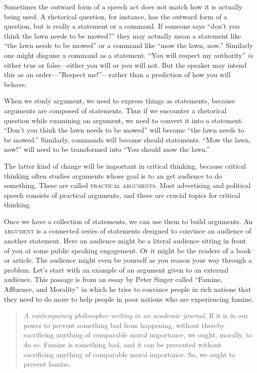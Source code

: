 Sometimes the outward form of a speech act does not match how it is actually being used. A rhetorical question, for instance, has the outward form of a question, but is really a statement or a command. If someone says ``don't you think the lawn needs to be mowed?'' they may actually mean a statement like ``the lawn needs to be mowed'' or a command like ``mow the lawn, now.'' Similarly one might disguise a command as a statement. ``You will respect my authority'' \emph{is} either true or false---either you will or you will not. But the speaker may intend this as an order---''Respect me!''---rather than a prediction of how you will behave.

When we study argument, we need to express things as statements, because arguments are composed of statements. Thus if we encounter a rhetorical question while examining an argument, we need to convert it into a statement. ``Don't you think the lawn needs to be mowed'' will become ``the lawn needs to be mowed.'' Similarly, commands will become should statements. ``Mow the lawn, now!'' will need to be transformed into ``You should mow the lawn.''

The latter kind of change will be important in critical thinking, because critical thinking often studies arguments whose goal is to an get audience to do something. These are called \textsc{\glspl{practical argument}}\label{def:practical_argument}. Most advertising and political speech consists of practical arguments, and these are crucial topics for critical thinking.

Once we have a collection of statements, we can use them to build arguments. An \textsc{\gls{argument}} \label{def:argument} is a connected series of statements designed to convince an audience of another statement. Here an audience might be a literal audience sitting in front of you at some public speaking engagement. Or it might be the readers of a book or article. The audience might even be yourself as you reason your way through a problem. Let's start with an example of an argument given to an external audience. This passage is from an essay by Peter Singer called ``Famine, Affluence, and Morality'' in which he tries to convince people in rich nations that they need to do more to help people in poor nations who are experiencing famine.

\begin{quotation}
\noindent \textit{A contemporary philosopher writing in an academic journal.}
If it is in our power to prevent something bad from happening, without thereby sacrificing anything of comparable moral importance, we ought, morally, to do so. Famine is something bad, and it can be prevented without sacrificing anything of comparable moral importance. So, we ought to prevent famine.\cite{Singer1972}  
\end{quotation}\label{singer_quote}

